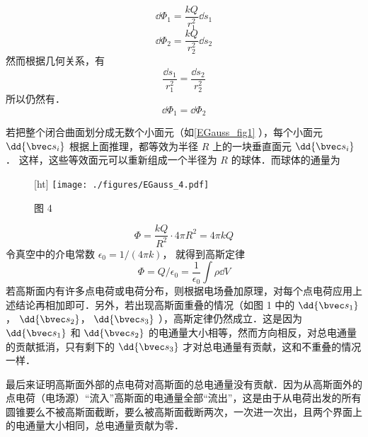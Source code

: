 \begin{equation}
\dd{\Phi_1} = \frac{kQ}{r_1^2} \dd{s_1}
\end{equation}
\begin{equation}
\dd{\Phi_2} = \frac{kQ}{r_2^2} \dd{s_2}
\end{equation}
然而根据几何关系，有
\begin{equation}
\frac{\dd{s_1}}{r_1^2} = \frac{\dd{s_2}}{r_2^2}
\end{equation} 
所以仍然有．
\begin{equation}
\dd{\Phi_1} = \dd{\Phi_2}
\end{equation} 

若把整个闭合曲面划分成无数个小面元（如\autoref{EGauss_fig1} ），每个小面元 $\dd{\bvec s_i}$ 根据上面推理，都等效为半径 $R$ 上的一块垂直面元 $\dd{\bvec s_i}$． 这样，这些等效面元可以重新组成一个半径为 $R$ 的球体．而球体的通量为
\begin{figure}\label{EGauss_fig1}[ht]
\centering
\texttt{[image: ./figures/EGauss\_4.pdf]}
\caption{图 4}
\end{figure}

\begin{equation}
\Phi  = \frac{kQ}{R^2} \cdot 4\pi R^2 = 4\pi kQ
\end{equation} 
令真空中的介电常数 $\epsilon_0 = 1/(4\pi k)$， 就得到高斯定律
\begin{equation}
\Phi  = Q/\epsilon_0 = \frac{1}{\epsilon_0} \int \rho \dd{V}
\end{equation} 
若高斯面内有许多点电荷或电荷分布，则根据电场叠加原理，对每个点电荷应用上述结论再相加即可．另外，若出现高斯面重叠的情况（如图 1 中的 $\dd{\bvec s_1}$，  $\dd{\bvec s_2}$，  $\dd{\bvec s_3}$ ），高斯定律仍然成立．这是因为 $\dd{\bvec s_1}$ 和 $\dd{\bvec s_2}$ 的电通量大小相等，然而方向相反，对总电通量的贡献抵消，只有剩下的 $\dd{\bvec s_3}$ 才对总电通量有贡献，这和不重叠的情况一样．

最后来证明高斯面外部的点电荷对高斯面的总电通量没有贡献．因为从高斯面外的点电荷（电场源）“流入”高斯面的电通量全部“流出”，这是由于从电荷出发的所有圆锥要么不被高斯面截断，要么被高斯面截断两次，一次进一次出，且两个界面上的电通量大小相同，总电通量贡献为零．
 